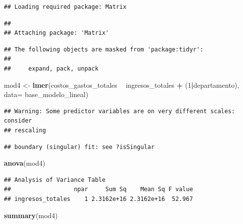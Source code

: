 \documentclass[
  11pt,
]{book}
\newenvironment{Shaded}{\begin{snugshade}}{\end{snugshade}}
\newcommand{\DataTypeTok}[1]{\textcolor[rgb]{0.13,0.29,0.53}{#1}}
\newcommand{\DecValTok}[1]{\textcolor[rgb]{0.00,0.00,0.81}{#1}}
\newcommand{\KeywordTok}[1]{\textcolor[rgb]{0.13,0.29,0.53}{\textbf{#1}}}
\newcommand{\NormalTok}[1]{#1}
\newcommand{\OperatorTok}[1]{\textcolor[rgb]{0.81,0.36,0.00}{\textbf{#1}}}
\newcommand{\StringTok}[1]{\textcolor[rgb]{0.31,0.60,0.02}{#1}}
\begin{document}
\begin{verbatim}
## Loading required package: Matrix
\end{verbatim}

\begin{verbatim}
## 
## Attaching package: 'Matrix'
\end{verbatim}

\begin{verbatim}
## The following objects are masked from 'package:tidyr':
## 
##     expand, pack, unpack
\end{verbatim}

\begin{Shaded}
\begin{Highlighting}[]
\NormalTok{mod4 <-}\StringTok{ }\KeywordTok{lmer}\NormalTok{(costos_gastos_totales }\OperatorTok{~}\StringTok{ }\NormalTok{ingresos_totales }\OperatorTok{+}\StringTok{ }\NormalTok{(}\DecValTok{1}\OperatorTok{|}\NormalTok{departamento), }
             \DataTypeTok{data=}\NormalTok{ base_modelo_lineal) }
\end{Highlighting}
\end{Shaded}

\begin{verbatim}
## Warning: Some predictor variables are on very different scales: consider
## rescaling
\end{verbatim}

\begin{verbatim}
## boundary (singular) fit: see ?isSingular
\end{verbatim}

\begin{Shaded}
\begin{Highlighting}[]
\KeywordTok{anova}\NormalTok{(mod4)}
\end{Highlighting}
\end{Shaded}

\begin{verbatim}
## Analysis of Variance Table
##                  npar     Sum Sq    Mean Sq F value
## ingresos_totales    1 2.3162e+16 2.3162e+16  52.967
\end{verbatim}

\begin{Shaded}
\begin{Highlighting}[]
\KeywordTok{summary}\NormalTok{(mod4)}
\end{Highlighting}
\end{Shaded}
\end{document}
